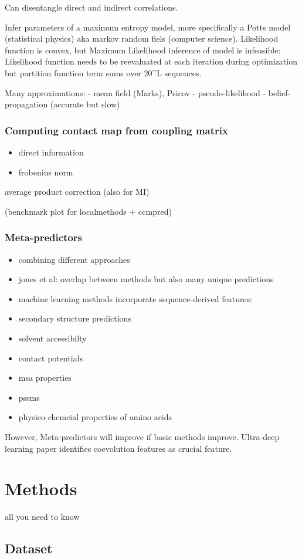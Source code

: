 \documentclass[12pt,a4paper,twoside]{book}
\providecommand{\tightlist}{%
  \setlength{\itemsep}{0pt}\setlength{\parskip}{0pt}}
\begin{document}
Can disentangle direct and indirect correlations.

Infer parameters of a maximum entropy model, more specifically a Potts
model (statistical physics) aka markov random fiels (computer science).
Likelihood function is convex, but Maximum Likelihood inference of model
is infeasible: Likelihood function needs to be reevaluated at each
iteration during optimization but partition function term sums over
20\^{}L sequences.

Many approximations: - mean field (Marks), Psicov - pseudo-likelihood -
belief-propagation (accurate but slow)

\subsection{Computing contact map from coupling
matrix}\label{computing-contact-map-from-coupling-matrix}

\begin{itemize}
\tightlist
\item
  direct information
\item
  frobenius norm
\end{itemize}

average product correction (also for MI)

(benchmark plot for localmethods + ccmpred)

\subsection{Meta-predictors}\label{meta-predictors}

\begin{itemize}
\tightlist
\item
  combining different approaches
\item
  jones et al: overlap between methods but also many unique predictions
\item
  machine learning methods incorporate sequence-derived features:
\item
  secondary structure predictions
\item
  solvent accessibilty
\item
  contact potentials
\item
  msa properties
\item
  pssms
\item
  physico-chemcial properties of amino acids
\end{itemize}

However, Meta-predictors will improve if basic methods improve.
Ultra-deep learning paper identifies coevolution features as crucial
feature.

\chapter{Methods}\label{methods}

all you need to know

\section{Dataset}\label{dataset}


\end{document}
